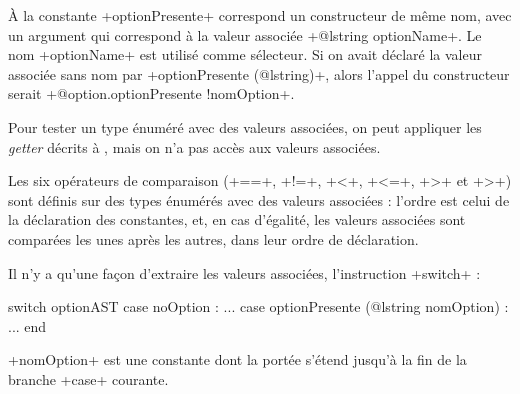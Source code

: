 À la constante \ggst+optionPresente+ correspond un constructeur de même nom, avec un argument qui correspond à la valeur associée \ggst+@lstring optionName+. Le nom \ggst+optionName+ est utilisé comme sélecteur. Si on avait déclaré la valeur associée sans nom par \ggst+optionPresente (@lstring)+, alors l'appel du constructeur serait \ggst+@option.optionPresente {!nomOption}+.

Pour tester un type énuméré avec des valeurs associées, on peut appliquer les \emph{getter} décrits à , mais on n'a pas accès aux valeurs associées.

Les six opérateurs de comparaison (\ggst+==+, \ggst+!=+, \ggst+<+, \ggst+<=+, \ggst+>+ et \ggst+>+) sont définis sur des types énumérés avec des valeurs associées : l'ordre est celui de la déclaration des constantes, et, en cas d'égalité, les valeurs associées sont comparées les unes après les autres, dans leur ordre de déclaration.

Il n'y a qu'une façon d'extraire les valeurs associées, l'instruction \ggst+switch+ :

\begin{galgas3}
switch optionAST
case noOption : ...
case optionPresente (@lstring nomOption) : ...
end
\end{galgas3}

\ggst+nomOption+ est une constante dont la portée s'étend jusqu'à la fin de la branche \ggst+case+ courante.












